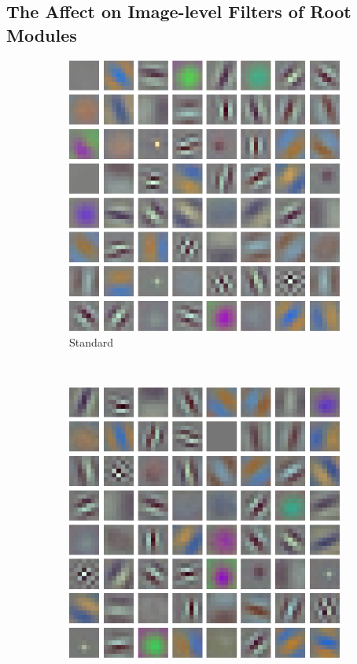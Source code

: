 \documentclass[thesis]{subfiles}
\begin{document}
	\subsection{The Affect on Image-level Filters of Root Modules}
	\begin{figure}[tb]
		\centering
		\begin{subfigure}[b]{0.45\textwidth}
			\centering
			\includegraphics[width=\textwidth]{Figs/Raster/msrc-resnet-50-conv1}
			\caption{Standard}
			\label{fig:resnet50normalconv0}
		\end{subfigure}
		~
		\begin{subfigure}[b]{0.45\textwidth}
			\centering
			\includegraphics[width=\textwidth]{Figs/Raster/msrc-resnet-50-conv1-root4-convonly}

\end{subfigure}
\end{figure}
\end{document}
